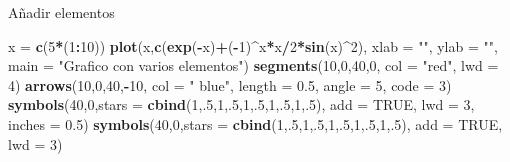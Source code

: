 \documentclass[
  ignorenonframetext,
  aspectratio=169]{beamer}
\newenvironment{Shaded}{\begin{snugshade}}{\end{snugshade}}
\newcommand{\AttributeTok}[1]{\textcolor[rgb]{0.13,0.29,0.53}{#1}}
\newcommand{\ConstantTok}[1]{\textcolor[rgb]{0.56,0.35,0.01}{#1}}
\newcommand{\DecValTok}[1]{\textcolor[rgb]{0.00,0.00,0.81}{#1}}
\newcommand{\FloatTok}[1]{\textcolor[rgb]{0.00,0.00,0.81}{#1}}
\newcommand{\FunctionTok}[1]{\textcolor[rgb]{0.13,0.29,0.53}{\textbf{#1}}}
\newcommand{\NormalTok}[1]{#1}
\newcommand{\OtherTok}[1]{\textcolor[rgb]{0.56,0.35,0.01}{#1}}
\newcommand{\SpecialCharTok}[1]{\textcolor[rgb]{0.81,0.36,0.00}{\textbf{#1}}}
\newcommand{\StringTok}[1]{\textcolor[rgb]{0.31,0.60,0.02}{#1}}
\begin{document}
\begin{frame}[fragile]{Añadir elementos}
\label{auxf1adir-elementos}
\begin{Shaded}
\begin{Highlighting}[]
\NormalTok{x }\OtherTok{=} \FunctionTok{c}\NormalTok{(}\DecValTok{5}\SpecialCharTok{*}\NormalTok{(}\DecValTok{1}\SpecialCharTok{:}\DecValTok{10}\NormalTok{))}
\FunctionTok{plot}\NormalTok{(x,}\FunctionTok{c}\NormalTok{(}\FunctionTok{exp}\NormalTok{(}\SpecialCharTok{{-}}\NormalTok{x)}\SpecialCharTok{+}\NormalTok{(}\SpecialCharTok{{-}}\DecValTok{1}\NormalTok{)}\SpecialCharTok{\^{}}\NormalTok{x}\SpecialCharTok{*}\NormalTok{x}\SpecialCharTok{/}\DecValTok{2}\SpecialCharTok{*}\FunctionTok{sin}\NormalTok{(x)}\SpecialCharTok{\^{}}\DecValTok{2}\NormalTok{), }\AttributeTok{xlab =} \StringTok{""}\NormalTok{, }\AttributeTok{ylab =} \StringTok{""}\NormalTok{, }
     \AttributeTok{main =} \StringTok{"Grafico con varios elementos"}\NormalTok{)}
\FunctionTok{segments}\NormalTok{(}\DecValTok{10}\NormalTok{,}\DecValTok{0}\NormalTok{,}\DecValTok{40}\NormalTok{,}\DecValTok{0}\NormalTok{, }\AttributeTok{col =} \StringTok{"red"}\NormalTok{, }\AttributeTok{lwd =} \DecValTok{4}\NormalTok{)}
\FunctionTok{arrows}\NormalTok{(}\DecValTok{10}\NormalTok{,}\DecValTok{0}\NormalTok{,}\DecValTok{40}\NormalTok{,}\SpecialCharTok{{-}}\DecValTok{10}\NormalTok{, }\AttributeTok{col =} \StringTok{" blue"}\NormalTok{, }\AttributeTok{length =} \FloatTok{0.5}\NormalTok{,}
       \AttributeTok{angle =} \DecValTok{5}\NormalTok{, }\AttributeTok{code =} \DecValTok{3}\NormalTok{)}
\FunctionTok{symbols}\NormalTok{(}\DecValTok{40}\NormalTok{,}\DecValTok{0}\NormalTok{,}\AttributeTok{stars =} \FunctionTok{cbind}\NormalTok{(}\DecValTok{1}\NormalTok{,.}\DecValTok{5}\NormalTok{,}\DecValTok{1}\NormalTok{,.}\DecValTok{5}\NormalTok{,}\DecValTok{1}\NormalTok{,.}\DecValTok{5}\NormalTok{,}\DecValTok{1}\NormalTok{,.}\DecValTok{5}\NormalTok{,}\DecValTok{1}\NormalTok{,.}\DecValTok{5}\NormalTok{), }
        \AttributeTok{add =} \ConstantTok{TRUE}\NormalTok{, }\AttributeTok{lwd =} \DecValTok{3}\NormalTok{, }\AttributeTok{inches =} \FloatTok{0.5}\NormalTok{)}
\FunctionTok{symbols}\NormalTok{(}\DecValTok{40}\NormalTok{,}\DecValTok{0}\NormalTok{,}\AttributeTok{stars =} \FunctionTok{cbind}\NormalTok{(}\DecValTok{1}\NormalTok{,.}\DecValTok{5}\NormalTok{,}\DecValTok{1}\NormalTok{,.}\DecValTok{5}\NormalTok{,}\DecValTok{1}\NormalTok{,.}\DecValTok{5}\NormalTok{,}\DecValTok{1}\NormalTok{,.}\DecValTok{5}\NormalTok{,}\DecValTok{1}\NormalTok{,.}\DecValTok{5}\NormalTok{),}
        \AttributeTok{add =} \ConstantTok{TRUE}\NormalTok{, }\AttributeTok{lwd =} \DecValTok{3}\NormalTok{)}

\end{Highlighting}
\end{Shaded}
\end{frame}
\end{document}
